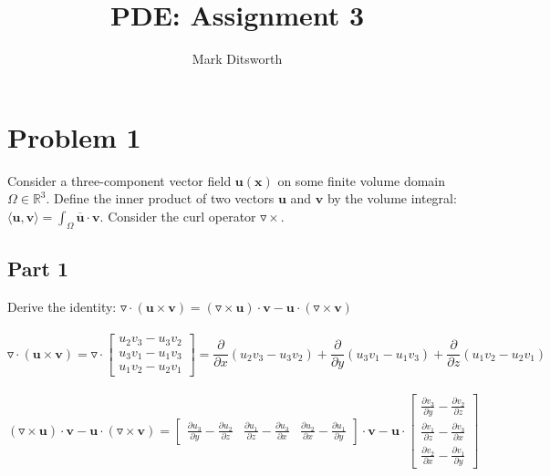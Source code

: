 \documentclass{amsart}
\title{PDE: Assignment 3}
\author{Mark Ditsworth}
\begin{document}
	\maketitle
	
	\section{Problem 1}
	Consider a three-component vector field $\mathbf{u(x)}$ on some finite volume domain $\Omega \in \mathbb{R}^3$. Define the inner product of two vectors $\mathbf{u}$ and $\mathbf{v}$ by the volume integral: $\langle\mathbf{u},\mathbf{v}\rangle = \int_{\Omega} \overline{\mathbf{u}} \cdot \mathbf{v}$. Consider the curl operator $\triangledown \times$.
	\\
	\subsection{Part 1}
	Derive the identity: $\triangledown \cdot (\mathbf{u} \times \mathbf{v}) = (\triangledown \times \mathbf{u}) \cdot \mathbf{v} - \mathbf{u} \cdot (\triangledown \times \mathbf{v})$
	\\\\
	\[ \triangledown \cdot (\mathbf{u} \times \mathbf{v})=
	   \triangledown \cdot
	   \begin{bmatrix}
		   u_2v_3 - u_3v_2\\
		   u_3v_1 - u_1v_3\\
		   u_1v_2 - u_2v_1
	   \end{bmatrix}=
	   \frac{\partial}{\partial x}(u_2v_3 - u_3v_2) + \frac{\partial}{\partial y}(u_3v_1 - u_1v_3) + 
	   \frac{\partial}{\partial z}(u_1v_2 - u_2v_1)
	\]\\
	
	\[ (\triangledown \times \mathbf{u}) \cdot \mathbf{v} - \mathbf{u} \cdot (\triangledown \times \mathbf{v}) = 
	\begin{bmatrix}
		\frac{\partial u_3}{\partial y} - \frac{\partial u_2}{\partial z} &
		\frac{\partial u_1}{\partial z} - \frac{\partial u_3}{\partial x} &
		\frac{\partial u_2}{\partial x} - \frac{\partial u_1}{\partial y}
	\end{bmatrix} \cdot \mathbf{v} - \mathbf{u} \cdot
	\begin{bmatrix}
		\frac{\partial v_3}{\partial y} - \frac{\partial v_2}{\partial z} \\
		\frac{\partial v_1}{\partial z} - \frac{\partial v_3}{\partial x} \\
		\frac{\partial v_2}{\partial x} - \frac{\partial v_1}{\partial y}
	\end{bmatrix}
	\]\\
	
\end{document}
